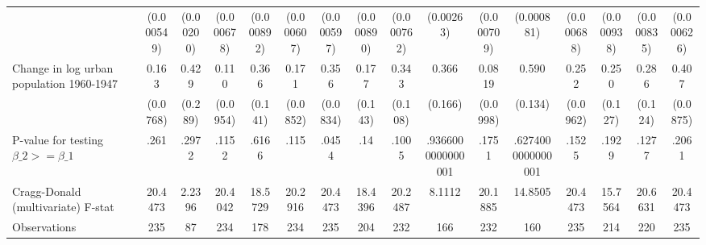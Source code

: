 {\begin{tabular}{l*{15}{c}}
                &(0.000549)         &(0.00200)         &(0.000678)         &(0.000892)         &(0.000607)         &(0.000597)         &(0.000890)         &(0.000762)         &(0.00263)         &(0.000709)         &(0.000881)         &(0.000688)         &(0.000938)         &(0.000835)         &(0.000626)         \\
[1em]
Change in log urban population 1960-1947&    0.163\sym{**} &    0.429         &    0.110         &    0.366\sym{**} &    0.171\sym{**} &    0.356\sym{***}&    0.177         &    0.343\sym{***}&    0.366\sym{**} &   0.0819         &    0.590\sym{***}&    0.252\sym{***}&    0.250\sym{*}  &    0.286\sym{**} &    0.407\sym{***}\\
                & (0.0768)         &  (0.289)         & (0.0954)         &  (0.141)         & (0.0852)         & (0.0834)         &  (0.143)         &  (0.108)         &  (0.166)         & (0.0998)         &  (0.134)         & (0.0962)         &  (0.127)         &  (0.124)         & (0.0875)         \\
\hline
P-value for testing $\beta\_{2} >= \beta\_{1}$&     .261         &    .2972         &    .1152         &    .6166         &     .115         &    .0454         &      .14         &    .1005         &.9366000000000001         &    .1751         &.6274000000000001         &    .1525         &    .1929         &    .1277         &    .2061         \\
Cragg-Donald (multivariate) F-stat&  20.4473         &   2.2396         &  20.4042         &  18.5729         &  20.2916         &  20.4473         &  18.4396         &  20.2487         &   8.1112         &  20.1885         &  14.8505         &  20.4473         &  15.7564         &  20.6631         &  20.4473         \\
Observations    &      235         &       87         &      234         &      178         &      234         &      235         &      204         &      232         &      166         &      232         &      160         &      235         &      214         &      220         &      235         \\
\hline\hline
\end{tabular}
}
